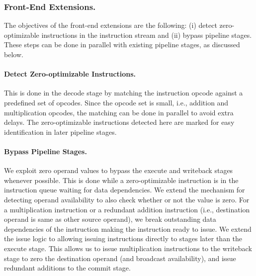 \subsubsection{Front-End Extensions.}
The objectives of the front-end extensions are the following: (i) detect zero-optimizable instructions in the instruction stream and (ii) bypass pipeline stages.  These steps can be done in parallel with existing pipeline stages, as discussed below.  

\paragraph{Detect Zero-optimizable Instructions.}
This is done in the decode stage by matching the instruction opcode against a predefined set of opcodes. Since the opcode set is small, i.e., addition and multiplication opcodes, the matching can be done in parallel to avoid extra delays.  The zero-optimizable instructions detected here are marked for easy identification in later pipeline stages. 

\paragraph{Bypass Pipeline Stages.}
We exploit zero operand values to bypass the execute and writeback stages whenever possible.  This is done while a zero-optimizable instruction is in the instruction queue waiting for data dependencies.  We extend the mechanism for detecting operand availability to also check whether or not the value is zero.  For a multiplication instruction or a redundant addition instruction (i.e., destination operand is same as other source operand), we break outstanding data dependencies of the instruction making the instruction ready to issue.  We extend the issue logic to allowing issuing instructions directly to stages later than the execute stage.  This allows us to issue multiplication instructions to the writeback stage to zero the destination operand (and broadcast availability), and issue redundant additions to the commit stage.   



